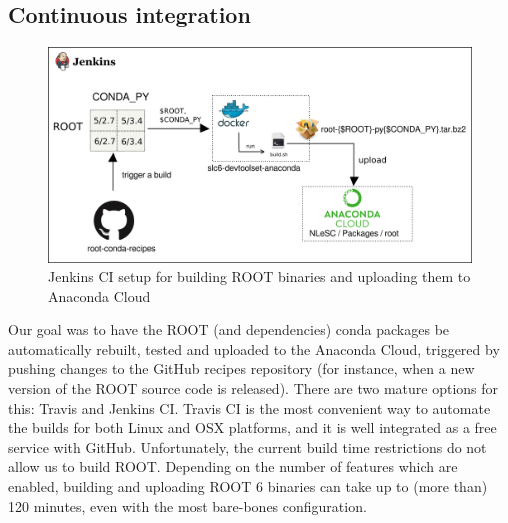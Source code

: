 \documentclass[a4paper]{jpconf}
\begin{document}
\subsection{Continuous integration}
\begin{figure}[!b]
\begin{center}
\includegraphics[width=0.8\linewidth]{./graphics/Jenkinssetup2.png}
\caption{Jenkins CI setup for building ROOT binaries and uploading them to Anaconda Cloud}
\label{fig:jenkins}
\end{center}
\end{figure}
Our goal was to have the ROOT (and dependencies) conda packages be automatically rebuilt, tested and uploaded 
to the Anaconda Cloud, triggered by pushing changes to the GitHub recipes repository (for instance, when a new version of the ROOT source code is released). 
There are two mature options for this: Travis and Jenkins CI. 
Travis CI is the most convenient way to automate the builds for both Linux and 
OSX platforms, and it is well integrated as a free service with GitHub. Unfortunately, the current build time restrictions do not 
allow us to build ROOT. Depending on the number of features which are enabled, building and uploading ROOT 6 binaries
 can take up to (more than) 120 minutes, even with 
the most bare-bones configuration.
\end{document}

